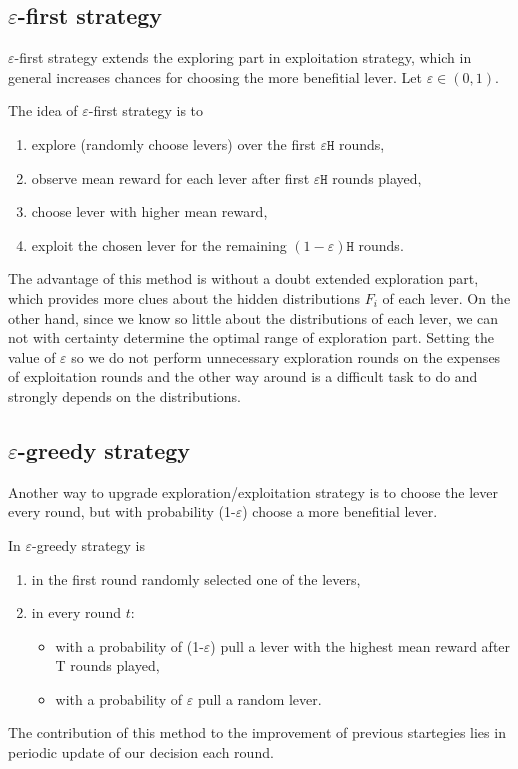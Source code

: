 \documentclass[11pt,american,czech]{article}
\begin{document}
	\subsection*{$\varepsilon$-first strategy}
	$\varepsilon$-first strategy extends the exploring part in exploitation strategy, which in general increases chances for choosing the more benefitial lever. Let $\varepsilon\in(0,1)$. 
	\begin{tcolorbox}[colframe=white]
		The idea of $\varepsilon$-first strategy is to
		\begin{enumerate}
			\item explore (randomly choose levers) over the first $\varepsilon\mathtt{H}$ rounds,
			\item observe mean reward for each lever after first $\varepsilon\mathtt{H}$ rounds played,
			\item choose lever with higher mean reward,
			\item exploit the chosen lever for the remaining $(1-\varepsilon)\mathtt{H}$ rounds.
		\end{enumerate}
	\end{tcolorbox}
	The advantage of this method is without a doubt extended exploration part, which provides more clues about the hidden distributions $F_{i}$ of each lever. On the other hand, since we know so little about the distributions of each lever, we can not with certainty determine the optimal range of exploration part. Setting the value of $\varepsilon$ so we do not perform unnecessary exploration rounds on the expenses of exploitation rounds and the other way around is a difficult task to do and strongly depends on the distributions.
	\subsection*{$\varepsilon$-greedy strategy}
	Another way to upgrade exploration/exploitation strategy is to choose the lever every round, but with probability (1-$\varepsilon$) choose a more benefitial lever. 
	\begin{tcolorbox}[colframe=white]
		In $\varepsilon$-greedy strategy is
		\begin{enumerate}
			\item in the first round randomly selected one of the levers,
			\item in every round $t$:
			\begin{itemize}
				\item with a probability of (1-$\varepsilon$) pull a lever with the highest mean reward after T rounds played,
				\item with a probability of $\varepsilon$ pull a random lever.
			\end{itemize}
		\end{enumerate}
	\end{tcolorbox}  
	The contribution of this method to the improvement of previous startegies lies in periodic update of our decision each round. 
	
\end{document}
